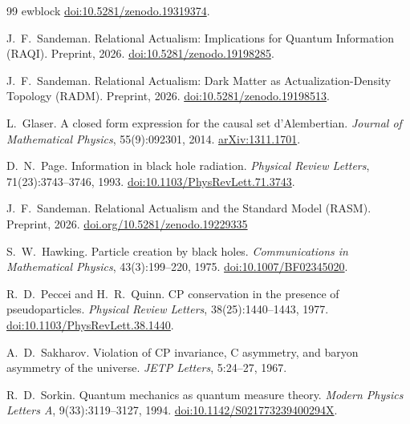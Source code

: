 \documentclass[11pt,a4paper]{article}
\begin{document}
\begin{thebibliography}{99}
ewblock \href{https://doi.org/10.5281/zenodo.19319374}{doi:10.5281/zenodo.19319374}.

J.~F.~Sandeman.
\newblock Relational Actualism: Implications for Quantum Information (RAQI).
\newblock Preprint, 2026.
\newblock \href{https://doi.org/10.5281/zenodo.19198285}%
  {doi:10.5281/zenodo.19198285}.

J.~F.~Sandeman.
\newblock Relational Actualism: Dark Matter as Actualization-Density
  Topology (RADM).
\newblock Preprint, 2026.
\newblock \href{https://doi.org/10.5281/zenodo.19198513}%
  {doi:10.5281/zenodo.19198513}.

L.~Glaser.
\newblock A closed form expression for the causal set d'Alembertian.
\newblock \emph{Journal of Mathematical Physics}, 55(9):092301, 2014.
\newblock \href{https://arxiv.org/abs/1311.1701}{arXiv:1311.1701}.

D.~N.~Page.
\newblock Information in black hole radiation.
\newblock \emph{Physical Review Letters}, 71(23):3743--3746, 1993.
\newblock \href{https://doi.org/10.1103/PhysRevLett.71.3743}{doi:10.1103/PhysRevLett.71.3743}.

J.~F.~Sandeman.
\newblock Relational Actualism and the Standard Model (RASM).
\newblock Preprint, 2026.
\newblock \href{https://doi.org/10.5281/zenodo.19229335}{doi.org/10.5281/zenodo.19229335}

S.~W.~Hawking.
\newblock Particle creation by black holes.
\newblock \emph{Communications in Mathematical Physics}, 43(3):199--220, 1975.
\newblock \href{https://doi.org/10.1007/BF02345020}{doi:10.1007/BF02345020}.

R.~D.~Peccei and H.~R.~Quinn.
\newblock CP conservation in the presence of pseudoparticles.
\newblock \emph{Physical Review Letters}, 38(25):1440--1443, 1977.
\newblock \href{https://doi.org/10.1103/PhysRevLett.38.1440}{doi:10.1103/PhysRevLett.38.1440}.

A.~D.~Sakharov.
\newblock Violation of CP invariance, C asymmetry, and baryon asymmetry of the universe.
\newblock \emph{JETP Letters}, 5:24--27, 1967.

R.~D.~Sorkin.
\newblock Quantum mechanics as quantum measure theory.
\newblock \emph{Modern Physics Letters A}, 9(33):3119--3127, 1994.
\newblock \href{https://doi.org/10.1142/S021773239400294X}%
  {doi:10.1142/S021773239400294X}.


\end{thebibliography}
\end{document}
